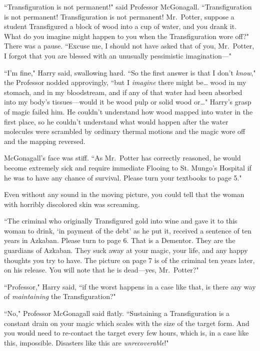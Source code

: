 
``Transfiguration is not permanent!" said Professor McGonagall. ``Transfiguration is not permanent! Transfiguration is not permanent! Mr.~Potter, suppose a student Transfigured a block of wood into a cup of water, and you drank it. What do you imagine might happen to you when the Transfiguration wore off?" There was a pause. ``Excuse me, I should not have asked that of you, Mr.~Potter, I forgot that you are blessed with an unusually pessimistic imagination—"

``I'm fine," Harry said, swallowing hard. ``So the first answer is that I don't \emph{know}," the Professor nodded approvingly, ``but I \emph{imagine} there might be{\ldots} wood in my stomach, and in my bloodstream, and if any of that water had been absorbed into my body's tissues—would it be wood pulp or solid wood or{\ldots}" Harry's grasp of magic failed him. He couldn't understand how wood mapped into water in the first place, so he couldn't understand what would happen after the water molecules were scrambled by ordinary thermal motions and the magic wore off and the mapping reversed.

McGonagall's face was stiff. ``As Mr.~Potter has correctly reasoned, he would become extremely sick and require immediate Flooing to St. Mungo's Hospital if he was to have any chance of survival. Please turn your textbooks to page 5."

Even without any sound in the moving picture, you could tell that the woman with horribly discolored skin was screaming.

``The criminal who originally Transfigured gold into wine and gave it to this woman to drink, `in payment of the debt' as he put it, received a sentence of ten years in Azkaban. Please turn to page 6. That is a Dementor. They are the guardians of Azkaban. They suck away at your magic, your life, and any happy thoughts you try to have. The picture on page 7 is of the criminal ten years later, on his release. You will note that he is dead—yes, Mr.~Potter?"

``Professor," Harry said, ``if the worst happens in a case like that, is there any way of \emph{maintaining} the Transfiguration?"

``No," Professor McGonagall said flatly. ``Sustaining a Transfiguration is a constant drain on your magic which scales with the size of the target form. And you would need to re-contact the target every few hours, which is, in a case like this, impossible. Disasters like this are \emph{unrecoverable}!"

